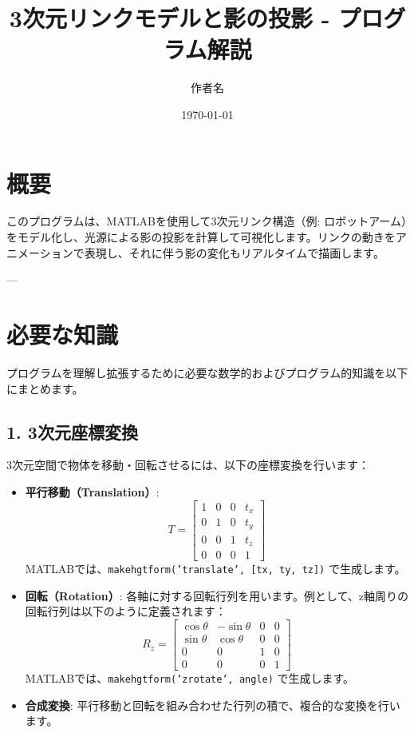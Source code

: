 \documentclass[a4paper,12pt]{article}
\title{3次元リンクモデルと影の投影 - プログラム解説}
\author{作者名}
\date{\today}
\begin{document}
\maketitle

\section*{概要}
このプログラムは、MATLABを使用して3次元リンク構造（例: ロボットアーム）をモデル化し、光源による影の投影を計算して可視化します。リンクの動きをアニメーションで表現し、それに伴う影の変化もリアルタイムで描画します。

---

\section*{必要な知識}
プログラムを理解し拡張するために必要な数学的およびプログラム的知識を以下にまとめます。

\subsection*{1. 3次元座標変換}
3次元空間で物体を移動・回転させるには、以下の座標変換を行います：
\begin{itemize}
    \item \textbf{平行移動（Translation）}:
    \[
    T = \begin{bmatrix}
    1 & 0 & 0 & t_x \\
    0 & 1 & 0 & t_y \\
    0 & 0 & 1 & t_z \\
    0 & 0 & 0 & 1
    \end{bmatrix}
    \]
    MATLABでは、\texttt{makehgtform('translate', [tx, ty, tz])} で生成します。

    \item \textbf{回転（Rotation）}:
    各軸に対する回転行列を用います。例として、z軸周りの回転行列は以下のように定義されます：
    \[
    R_z = \begin{bmatrix}
    \cos\theta & -\sin\theta & 0 & 0 \\
    \sin\theta & \cos\theta & 0 & 0 \\
    0 & 0 & 1 & 0 \\
    0 & 0 & 0 & 1
    \end{bmatrix}
    \]
    MATLABでは、\texttt{makehgtform('zrotate', angle)} で生成します。

    \item \textbf{合成変換}:
    平行移動と回転を組み合わせた行列の積で、複合的な変換を行います。
\end{itemize}
\end{document}
